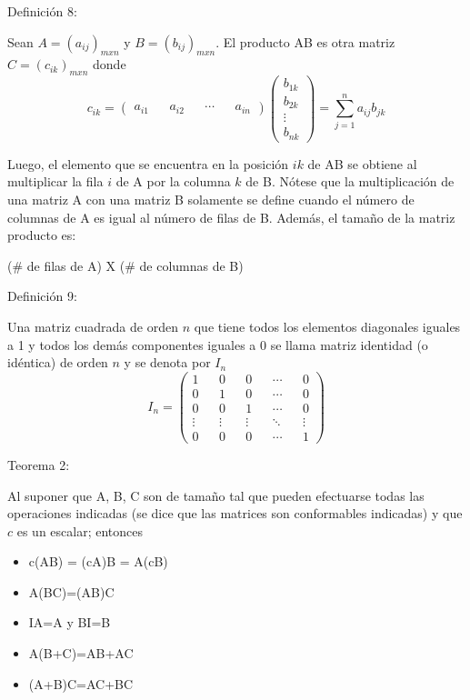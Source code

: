 \documentclass[twocolumn]{article}
\begin{document}
Definici\'on 8:

Sean $A = (a_{ij})_{mxn}$ y $B = (b_{ij})_{mxn}$. El producto AB es otra matriz $C = (c_{ik})_{mxn}$ donde 
$$
c_{ik}= 
\begin{pmatrix}
a_{i1} && a_{i2} && \cdots && a_{in}
\end{pmatrix}
\begin{pmatrix}
b_{1k} \\
b_{2k} \\
\vdots \\
b_{nk}
\end{pmatrix}
= \displaystyle\sum_{j=1}^n a_{ij}b_{jk}
$$

Luego, el elemento que se encuentra en la posici\'on $ik$ de AB se obtiene al multiplicar la 
fila $i$ de A por la columna $k$ de B. N\'otese que la multiplicaci\'on de una matriz A con
una matriz B solamente se define cuando el n\'umero de columnas de A es igual al n\'umero de
filas de B. Adem\'as, el tamaño de la matriz producto es:
\begin{center}
($\#$ de filas de A) X ($\#$ de columnas de B)
\end{center}

Definici\'on 9:

Una matriz cuadrada de orden $n$ que tiene todos los elementos diagonales iguales a 1 y 
todos los dem\'as componentes iguales a 0 se llama matriz identidad (o id\'entica) de orden
$n$ y se denota por $I_n$
$$ I_n=
\begin{pmatrix}
1 && 0 && 0 && \cdots && 0 \\
0 && 1 && 0 && \cdots && 0 \\
0 && 0 && 1 && \cdots && 0 \\
\vdots && \vdots && \vdots && \ddots && \vdots \\
0 && 0 && 0 && \cdots && 1 
\end{pmatrix}
$$

Teorema 2:

Al suponer que A, B, C son de tamaño tal que pueden efectuarse todas las operaciones
indicadas (se dice que las matrices son conformables indicadas) y que $c$ es un escalar;
entonces
\begin{itemize}
\item c(AB) = (cA)B = A(cB)
\item A(BC)=(AB)C
\item IA=A y BI=B
\item A(B+C)=AB+AC
\item (A+B)C=AC+BC
\end{itemize}
\end{document}
